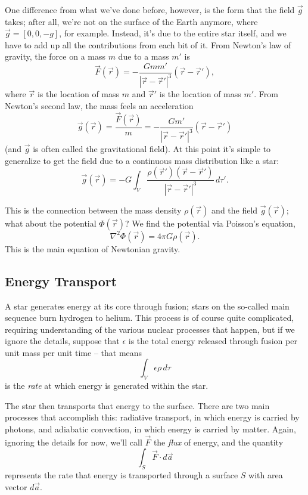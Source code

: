 One difference from what we've done before, however, is the form that the field $\vec{g}$ takes; after all, we're not on the surface of the Earth anymore, where $\vec{g} = [0, 0, -g]$, for example.  Instead, it's due to the entire star itself, and we have to add up all the contributions from each bit of it.  From Newton's law of gravity, the force on a mass $m$ due to a mass $m'$ is 
\[
\vec{F}(\vec{r}) = -\frac{G m m'}{|\vec{r} - \vec{r}'|^3} (\vec{r} - \vec{r}'),
\]
where $\vec{r}$ is the location of mass $m$ and $\vec{r}'$ is the location of mass $m'$.  From Newton's second law, the mass feels an acceleration
\[
\vec{g}(\vec{r}) = \frac{\vec{F}(\vec{r})}{m} = -\frac{G m'}{|\vec{r} - \vec{r}'|^3} (\vec{r} - \vec{r}')
\]
(and $\vec{g}$ is often called the gravitational field).  At this point it's simple to generalize to get the field due to a continuous mass distribution like a star:
\begin{equation}
\vec{g}(\vec{r}) = -G \int_V \frac{ \rho(\vec{r}') (\vec{r} - \vec{r}')}{|\vec{r} - \vec{r}'|^3} \, d\tau'.
\end{equation}

This is the connection between the mass density $\rho(\vec{r})$ and the field $\vec{g}(\vec{r})$; what about the potential $\Phi(\vec{r})$?  We find the potential via Poisson's equation,
\begin{equation}
\label{eq_poisson}
\boxed{
\nabla^2 \Phi(\vec{r}) = 4 \pi G \rho(\vec{r}).
}
\end{equation}
This is the main equation of Newtonian gravity.


\subsection{Energy Transport}

A star generates energy at its core through fusion; stars on the so-called main sequence burn hydrogen to helium.  This process is of course quite complicated, requiring understanding of the various nuclear processes that happen, but if we ignore the details, suppose that $\epsilon$ is the total energy released through fusion per unit mass per unit time -- that means
\[
\int_V \epsilon \rho \, d\tau
\]
is the \emph{rate} at which energy is generated within the star.

The star then transports that energy to the surface.  There are two main processes that accomplish this:  radiative transport, in which energy is carried by photons, and adiabatic convection, in which energy is carried by matter.  Again, ignoring the details for now, we'll call $\vec{F}$ the \emph{flux} of energy, and the quantity
\[
\int_S \vec{F} \cdot d\vec{a}
\]
represents the rate that energy is transported through a surface $S$ with area vector $d\vec{a}$.

